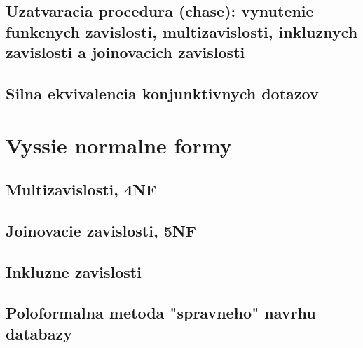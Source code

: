 \documentclass[12pt,a4paper]{article}
\begin{document}
\subsection{Uzatvaracia procedura (chase): vynutenie funkcnych zavislosti, multizavislosti, inkluznych zavislosti a joinovacich zavislosti}

\subsection{Silna ekvivalencia konjunktivnych dotazov}

\section{Vyssie normalne formy}

\subsection{Multizavislosti, 4NF}

\subsection{Joinovacie zavislosti, 5NF}

\subsection{Inkluzne zavislosti}

\subsection{Poloformalna metoda "spravneho" navrhu databazy}


 
\end{document}
